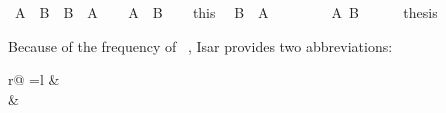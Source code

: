 \begin{isabellebody}
\isamarkuptrue%
\isamarkupfalse%
\ {\isachardoublequoteopen}A\ {\isasymand}\ B\ {\isasymlongrightarrow}\ B\ {\isasymand}\ A{\isachardoublequoteclose}\isanewline
%
\isadelimproof
%
\endisadelimproof
%
\isatagproof
{}\isamarkupfalse%
\isanewline
\ \ \isamarkupfalse%
\ {\isachardoublequoteopen}A\ {\isasymand}\ B{\isachardoublequoteclose}\isanewline
\ \ \isamarkupfalse%
\ this\ \isamarkupfalse%
\ {\isachardoublequoteopen}B\ {\isasymand}\ A{\isachardoublequoteclose}\isanewline
\ \ \isamarkupfalse%
\isanewline
\ \ \ \ \isamarkupfalse%
\ {\isachardoublequoteopen}A{\isachardoublequoteclose}\ {\isachardoublequoteopen}B{\isachardoublequoteclose}\isanewline
\ \ \ \ \isamarkupfalse%
\ {\isacharquery}thesis\ \isacommand{{\isachardot}{\isachardot}}\isamarkupfalse%
\isanewline
\ \ \isamarkupfalse%
\isanewline
{}\isamarkupfalse%
%
\endisatagproof
{\isafoldproof}%
%
\isadelimproof
%
\endisadelimproof
%
\begin{isamarkuptext}%
\noindent Because of the frequency of ~, Isar provides two abbreviations:
\begin{center}
\begin{tabular}{r@ {\quad=\quad}l}
 &   \\
 &  
\end{tabular}
\end{center}


\end{isamarkuptext}
\end{isabellebody}
